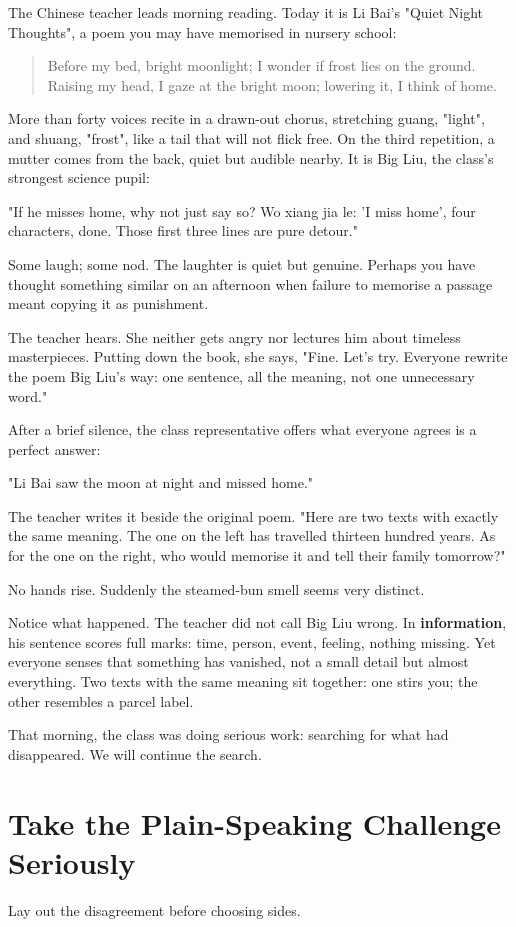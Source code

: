 The Chinese teacher leads morning reading. Today it is Li Bai's "Quiet Night Thoughts", a poem you may have memorised in nursery school:

\begin{quote}
Before my bed, bright moonlight; I wonder if frost lies on the ground. Raising my head, I gaze at the bright moon; lowering it, I think of home.
\end{quote}
More than forty voices recite in a drawn-out chorus, stretching guang, "light", and shuang, "frost", like a tail that will not flick free. On the third repetition, a mutter comes from the back, quiet but audible nearby. It is Big Liu, the class's strongest science pupil:

"If he misses home, why not just say so? Wo xiang jia le: 'I miss home', four characters, done. Those first three lines are pure detour."

Some laugh; some nod. The laughter is quiet but genuine. Perhaps you have thought something similar on an afternoon when failure to memorise a passage meant copying it as punishment.

The teacher hears. She neither gets angry nor lectures him about timeless masterpieces. Putting down the book, she says, "Fine. Let's try. Everyone rewrite the poem Big Liu's way: one sentence, all the meaning, not one unnecessary word."

After a brief silence, the class representative offers what everyone agrees is a perfect answer:

"Li Bai saw the moon at night and missed home."

The teacher writes it beside the original poem. "Here are two texts with exactly the same meaning. The one on the left has travelled thirteen hundred years. As for the one on the right, who would memorise it and tell their family tomorrow?"

No hands rise. Suddenly the steamed-bun smell seems very distinct.

Notice what happened. The teacher did not call Big Liu wrong. In \textbf{information}, his sentence scores full marks: time, person, event, feeling, nothing missing. Yet everyone senses that something has vanished, not a small detail but almost everything. Two texts with the same meaning sit together: one stirs you; the other resembles a parcel label.

That morning, the class was doing serious work: searching for what had disappeared. We will continue the search.

\section[The Plain-Speaking Challenge]{Take the Plain-Speaking Challenge Seriously}
Lay out the disagreement before choosing sides.

